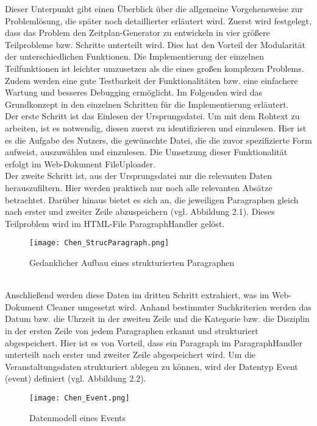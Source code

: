 Dieser Unterpunkt gibt einen Überblick über die allgemeine Vorgehensweise zur Problemlösung, die später noch detaillierter erläutert wird. 
Zuerst wird festgelegt, dass das Problem den Zeitplan-Generator zu entwickeln in vier größere Teilprobleme bzw. Schritte unterteilt wird. Dies hat den Vorteil der Modularität der unterschiedlichen Funktionen. Die Implementierung der einzelnen Teilfunktionen ist leichter umzusetzen als die eines großen komplexen Problems. Zudem werden eine gute Testbarkeit der Funktionalitäten bzw. eine einfachere Wartung und besseres Debugging ermöglicht. Im Folgenden wird das Grundkonzept in den einzelnen Schritten für die Implementierung erläutert.\\
Der erste Schritt ist das Einlesen der Ursprungsdatei. Um mit dem Rohtext zu arbeiten, ist es notwendig, diesen zuerst zu identifizieren und einzulesen. Hier ist es die Aufgabe des Nutzers, die gewünschte Datei, die die zuvor spezifizierte Form aufweist, auszuwählen und einzulesen. Die Umsetzung dieser Funktionalität erfolgt im Web-Dokument FileUploader.\\ 
Der zweite Schritt ist, aus der Ursprungsdatei nur die relevanten Daten herauszufiltern. Hier werden praktisch nur noch alle relevanten Absätze betrachtet. Darüber hinaus bietet es sich an, die jeweiligen Paragraphen gleich nach erster und zweiter Zeile abzuspeichern (vgl. Abbildung 2.1). Dieses Teilproblem wird im HTML-File ParagraphHandler gelöst.
\begin{figure}[htbp]
  \centering
  \texttt{[image: Chen\_StrucParagraph.png]}
  \caption{Gedanklicher Aufbau eines strukturierten Paragraphen}
  \label{fig:Fig1}
\end{figure}\\
Anschließend werden diese Daten im dritten Schritt extrahiert, was im Web-Dokument Cleaner umgesetzt wird. Anhand bestimmter Suchkriterien werden das Datum bzw. die Uhrzeit in der zweiten Zeile und die Kategorie bzw. die Disziplin in der ersten Zeile von jedem Paragraphen erkannt und strukturiert abgespeichert. Hier ist es von Vorteil, dass ein Paragraph im ParagraphHandler unterteilt nach erster und zweiter Zeile abgespeichert wird. Um die Veranstaltungsdaten strukturiert ablegen zu können, wird der Datentyp Event (event) definiert (vgl. Abbildung 2.2).\\
\begin{figure}[htbp]
  \centering
  \texttt{[image: Chen\_Event.png]}
  \caption{Datenmodell eines Events}
  \label{fig:Fig1}
\end{figure}\\
